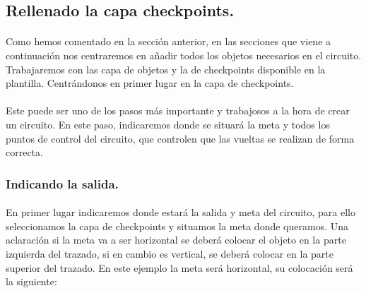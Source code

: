 \subsection{Rellenado la capa checkpoints.}

\paragraph{}
Como hemos comentado en la sección anterior, en las secciones que viene a continuación nos centraremos en añadir todos los 
objetos necesarios en el circuito. Trabajaremos con las capa de objetos y la de checkpoints disponible en la plantilla. 
Centrándonos en primer lugar en la capa de checkpoints.

\paragraph{}
Este puede ser uno de los pasos más importante y trabajosos a la hora de crear un circuito. En este paso, indicaremos donde se 
situará la meta y todos los puntos de control del circuito, que controlen que las vueltas se realizan de forma correcta.

\subsubsection{Indicando la salida.}

\paragraph{}
En primer lugar indicaremos donde estará la salida y meta del circuito, para ello seleccionamos la capa de checkpoints y 
situamos la meta donde queramos. Una aclaración si la meta va a ser horizontal se deberá colocar el objeto en la parte izquierda
del trazado, si en cambio es vertical, se deberá colocar en la parte superior del trazado. En este ejemplo la meta será horizontal,
su colocación será la siguiente:

